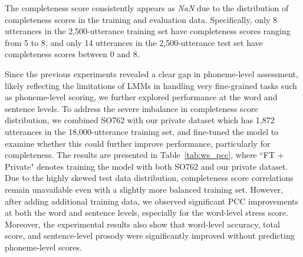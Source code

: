 \documentclass{article}
\begin{document}
The completeness score consistently appears as \textit{NaN} due to the distribution of completeness scores in the training and evaluation data. Specifically, only 8 utterances in the 2,500-utterance training set have completeness scores ranging from 5 to 8, and only 14 utterances in the 2,500-utterance test set have completeness scores between 0 and 8.

Since the previous experiments revealed a clear gap in phoneme-level assessment, likely reflecting the limitations of LMMs in handling very fine-grained tasks such as phoneme-level scoring, we further explored performance at the word and sentence levels. To address the severe imbalance in completeness score distribution, we combined SO762 with our private dataset which has 1,872 utterances in the 18,000-utterance training set, and fine-tuned the model to examine whether this could further improve performance, particularly for completeness. The results are presented in Table~\ref{tab:ws_pcc}, where ``FT + Private" denotes training the model with both SO762 and our private dataset. Due to the highly skewed test data distribution, completeness score correlations remain unavailable even with a slightly more balanced training set. However, after adding additional training data, we observed significant PCC improvements at both the word and sentence levels, especially for the word-level stress score. Moreover, the experimental results also show that word-level accuracy, total score, and sentence-level prosody were significantly improved without predicting phoneme-level scores.

\begin{table}[thbp]
\caption{PCC results for word- and sentence-level scoring on the SO762 test set.}
\label{tab:ws_pcc}
\end{table}
\end{document}
